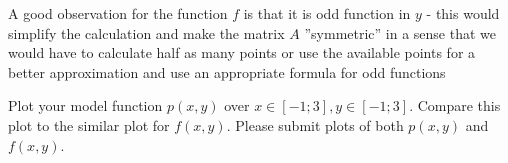 \documentclass[a4paper, oneside]{article}
\begin{document}
\begin{solution}
    
\end{solution}
\begin{remark}
    A good observation for the function $f$ is that it is odd function in $y$ - this would simplify the calculation and make the matrix $A$ ''symmetric'' in a sense that we would have to calculate half as many points or use the available points for a better approximation and use an appropriate formula for odd functions
\end{remark}
\begin{problem}
    Plot your model function $p(x, y)$ over $x \in [-1; 3], y \in [-1; 3]$. Compare this plot to the similar plot for $f (x, y)$. Please submit plots of both $p(x, y)$ and $f(x, y)$.
\end{problem}

\end{document}
